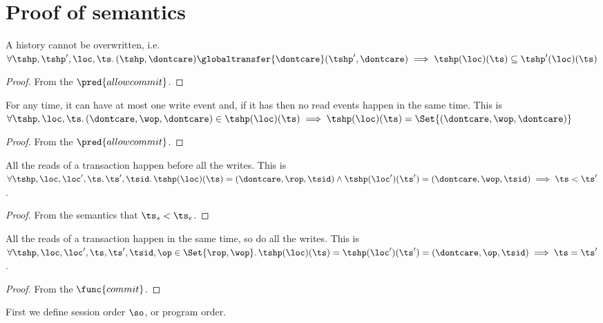 \section{Proof of semantics\label{sec:proof_semantics}}
\begin{lem}
    A history cannot be overwritten, i.e.\ \( \forall \tshp, \tshp', \loc, \ts \ldotp ( \tshp, \dontcare ) \globaltransfer{\dontcare} ( \tshp', \dontcare ) \implies \tshp(\loc)(\ts) \subseteq \tshp'(\loc)(\ts)\)
\end{lem}
\begin{proof}
    From the \( \pred{allowcommit} \).
\end{proof}

\begin{lem}
    For any time, it can have at most one write event and, if it has then no read events happen in the same time. This is \ \( \forall \tshp, \loc, \ts \ldotp ( \dontcare, \wop, \dontcare ) \in \tshp(\loc)(\ts) \implies \tshp(\loc)(\ts) =  \Set{( \dontcare, \wop, \dontcare )} \)
\end{lem}
\begin{proof}
    From the \( \pred{allowcommit} \).
\end{proof}

\begin{lem}
    \label{lem:read-before-write}
    All the reads of a transaction happen before all the writes. This is 
    \( \forall \tshp, \loc, \loc', \ts, \ts', \tsid \ldotp \tshp(\loc)(\ts) = (\dontcare, \rop, \tsid) \land \tshp(\loc')(\ts') = (\dontcare, \wop, \tsid) \implies \ts < \ts' \).
\end{lem}
\begin{proof}
    From the semantics that \( \ts_{s} < \ts_{e} \).
\end{proof}

\begin{lem}
    \label{lem:atoic-rw}
    All the reads of a transaction happen in the same time, so do all the writes. This is 
    \( \forall \tshp, \loc, \loc', \ts, \ts', \tsid, \op \in \Set{\rop, \wop} \ldotp \tshp(\loc)(\ts) =  \tshp(\loc')(\ts') = (\dontcare, \op, \tsid) \implies \ts = \ts' \).
\end{lem}
\begin{proof}
    From the \( \func{commit} \).
\end{proof}

First we define session order \( \so \), or program order.

